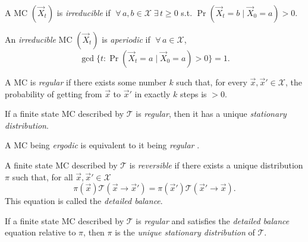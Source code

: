 \begin{definition}
    A MC $(\vec X_t)$ is \emph{irreducible} if $\;\forall\, a, b \in \mathcal X \;\exists\, t \geq 0$ s.t. $\Pr(\vec X_t = b \mid \vec X_0 = a) > 0$.
\end{definition}

\begin{definition}
    An \emph{irreducible} MC $(\vec X_t)$ is \emph{aperiodic} if $\;\forall\, a \in \mathcal X$,
    \begin{equation}
        \gcd\{t: \Pr(\vec X_t = a \mid \vec X_0 = a) > 0\} = 1.
    \end{equation}
\end{definition}

\begin{definition}
    A MC is \emph{regular} if there exists some number $k$ such that, for every $\vec x, \vec x' \in \mathcal X$, the probability of getting from $\vec x$ to $\vec x'$ in exactly $k$ steps is $> 0$.
\end{definition}

\begin{theorem}
    If a finite state MC described by $\mathcal T$ is \emph{regular}, then it has a unique \emph{stationary distribution}.
\end{theorem}

A MC being \emph{ergodic} is equivalent to it being \emph{regular} \cite[p.~510]{book:dknf}.

\begin{definition}
    A finite state MC described by $\mathcal T$ is \emph{reversible} if there exists a unique distribution $\pi$ such that, for all $\vec x, \vec x' \in \mathcal X$
    \begin{equation}
        \label{eqn:db}
        \pi(\vec x)\mathcal T(\vec x \to \vec x') = \pi(\vec x')\mathcal T(\vec x' \to \vec x).
    \end{equation}
    This equation is called the \emph{detailed balance}.
\end{definition}

\begin{proposition}
    If a finite state MC described by $\mathcal T$ is \emph{regular} and satisfies the \emph{detailed balance} equation relative to $\pi$, then $\pi$ is the \emph{unique stationary distribution} of $\mathcal T$.
\end{proposition}

